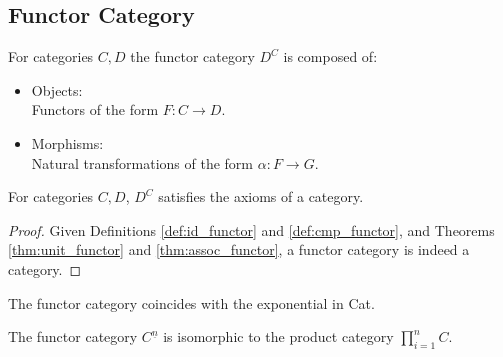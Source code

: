 \subsection{Functor Category}
\begin{definition}
  For categories $C, D$ the functor category $D^C$ is composed of:
  \parencite{leinster:basic_category_theory}
  \begin{itemize}
    \item Objects:\\
      Functors of the form $F:C\to D$.
    \item Morphisms:\\
      Natural transformations of the form $\alpha:F\to G$.
  \end{itemize}
\end{definition}

\begin{theorem}
  For categories $C, D$, $D^C$ satisfies the axioms of a category.

  \begin{proof}
    Given Definitions \ref{def:id_functor} and \ref{def:cmp_functor}, and
    Theorems \ref{thm:unit_functor} and \ref{thm:assoc_functor}, a functor
    category is indeed a category.
  \end{proof}
\end{theorem}

\begin{remark}
  The functor category coincides with the exponential in Cat.
\end{remark}

\begin{remark}
  The functor category $C^\underline{n}$ is isomorphic to the product category
  $\prod_{i=1}^n C$.
\end{remark}